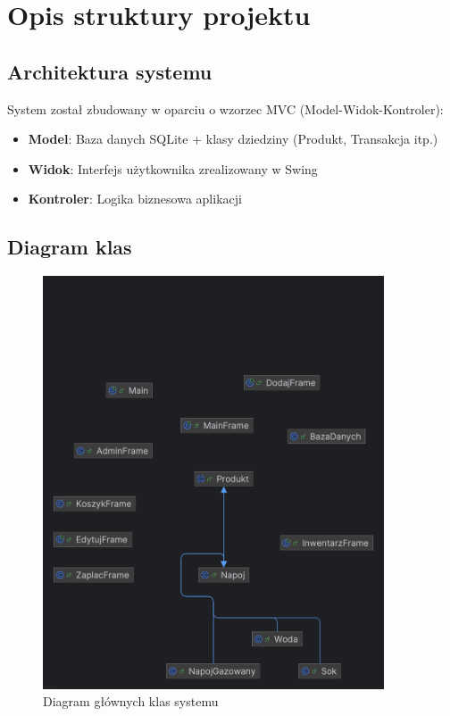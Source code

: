 \section{Opis struktury projektu}
\subsection{Architektura systemu}
System został zbudowany w oparciu o wzorzec MVC (Model-Widok-Kontroler):
\begin{itemize}
\item \textbf{Model}: Baza danych SQLite + klasy dziedziny (Produkt, Transakcja itp.)
\item \textbf{Widok}: Interfejs użytkownika zrealizowany w Swing
\item \textbf{Kontroler}: Logika biznesowa aplikacji
\end{itemize}


\subsection{Diagram klas}
\begin{figure}[H]
\centering
\includegraphics[width=0.9\textwidth]{figures/class_diagram.png}
\caption{Diagram głównych klas systemu}
\label{fig:class_diagram}
\end{figure}

